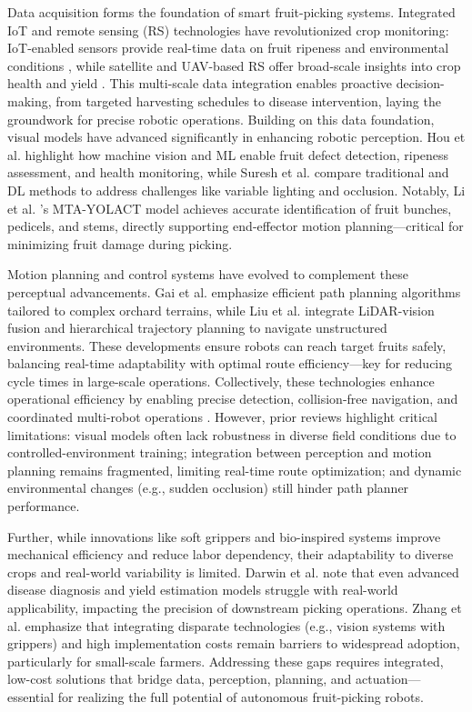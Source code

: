 \documentclass[a4paper,fleqn]{cas-dc}
\begin{document}
Data acquisition forms the foundation of smart fruit-picking systems. Integrated IoT and remote sensing (RS) technologies have revolutionized crop monitoring: IoT-enabled sensors provide real-time data on fruit ripeness and environmental conditions \cite{mohamed2021smart,friha2021internet}, while satellite and UAV-based RS offer broad-scale insights into crop health and yield \cite{martos2021ensuring}. This multi-scale data integration enables proactive decision-making, from targeted harvesting schedules to disease intervention, laying the groundwork for precise robotic operations.
Building on this data foundation, visual models have advanced significantly in enhancing robotic perception. Hou et al. \cite{hou2023overview} highlight how machine vision and ML enable fruit defect detection, ripeness assessment, and health monitoring, while Suresh et al. \cite{suresh2023selective} compare traditional and DL methods to address challenges like variable lighting and occlusion. Notably, Li et al. \cite{li2023mta}’s MTA-YOLACT model achieves accurate identification of fruit bunches, pedicels, and stems, directly supporting end-effector motion planning—critical for minimizing fruit damage during picking.

Motion planning and control systems have evolved to complement these perceptual advancements. Gai et al. \cite{gai2022fruit} emphasize efficient path planning algorithms tailored to complex orchard terrains, while Liu et al. \cite{liu2024hierarchical} integrate LiDAR-vision fusion and hierarchical trajectory planning to navigate unstructured environments. These developments ensure robots can reach target fruits safely, balancing real-time adaptability with optimal route efficiency—key for reducing cycle times in large-scale operations.
Collectively, these technologies enhance operational efficiency by enabling precise detection, collision-free navigation, and coordinated multi-robot operations \cite{li2023multi,zhang2024automatic}. However, prior reviews highlight critical limitations: visual models often lack robustness in diverse field conditions due to controlled-environment training; integration between perception and motion planning remains fragmented, limiting real-time route optimization; and dynamic environmental changes (e.g., sudden occlusion) still hinder path planner performance.

Further, while innovations like soft grippers \cite{navas2021soft} and bio-inspired systems \cite{wang2023biologically} improve mechanical efficiency and reduce labor dependency, their adaptability to diverse crops and real-world variability is limited. Darwin et al. \cite{darwin2021recognition} note that even advanced disease diagnosis and yield estimation models struggle with real-world applicability, impacting the precision of downstream picking operations. Zhang et al. \cite{zhang2024automatic} emphasize that integrating disparate technologies (e.g., vision systems with grippers) and high implementation costs remain barriers to widespread adoption, particularly for small-scale farmers. Addressing these gaps requires integrated, low-cost solutions that bridge data, perception, planning, and actuation—essential for realizing the full potential of autonomous fruit-picking robots.
\end{document}
